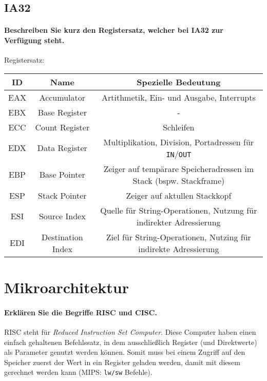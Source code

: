 		\subsection{IA32}
			\paragraph{Beschreiben Sie kurz den Registersatz, welcher bei IA32 zur Verfügung steht.}
				Registersatz: \\
				\begin{tabular}{c | c | c}
					ID  & Name              & Spezielle Bedeutung                                                 \\
					\hline
					EAX & Accumulator       & Artithmetik, Ein- und Ausgabe, Interrupts                           \\
					EBX & Base Register     & -                                                                   \\
					ECC & Count Register    & Schleifen                                                           \\
					EDX & Data Register     & Multiplikation, Division, Portadressen für \texttt{IN}/\texttt{OUT} \\
					EBP & Base Pointer      & Zeiger auf tempärare Speicheradressen im Stack (bspw. Stackframe)   \\
					ESP & Stack Pointer     & Zeiger auf aktullen Stackkopf                                       \\
					ESI & Source Index      & Quelle für String-Operationen, Nutzung für indirekter Adressierung  \\
					EDI & Destination Index & Ziel für String-Operationen, Nutzing für indirekte Adressierung     \\
				\end{tabular}

	\section{Mikroarchitektur}
		\paragraph{Erklären Sie die Begriffe RISC und CISC.}
			RISC steht für \textit{Reduced Instruction Set Computer}. Diese Computer haben einen einfach gehaltenen Befehlssatz, in dem ausschließlich Register (und Direktwerte) als Parameter genutzt werden können. Somit muss bei einem Zugriff auf den Speicher zuerst der Wert in ein Register geladen werden, damit mit diesem gerechnet werden kann (MIPS: \texttt{lw/sw} Befehle).

